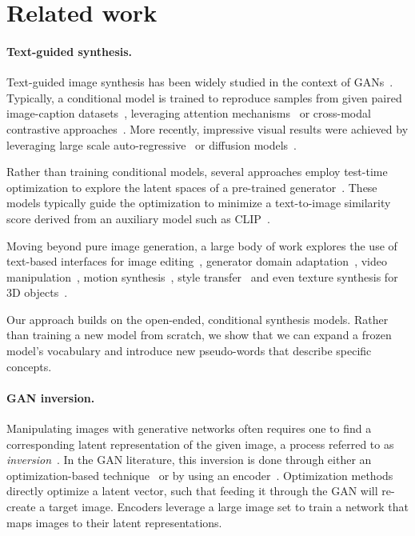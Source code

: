 \section{Related work}

\paragraph{Text-guided synthesis.}

Text-guided image synthesis has been widely studied in the context of GANs~\citep{goodfellow2014generative}. Typically, a conditional model is trained to reproduce samples from given paired image-caption datasets~\citep{zhu2019dm,tao2020df}, leveraging attention mechanisms~\citep{xu2018attngan} or cross-modal contrastive approaches~\citep{zhang2021cross,ye2021improving}. More recently, impressive visual results were achieved by leveraging large scale auto-regressive~\citep{ramesh2021zero,yu2022scaling} or diffusion models~\citep{ramesh2022hierarchical,saharia2022photorealistic,nichol2021glide,rombach2021highresolution}.

Rather than training conditional models, several approaches employ test-time optimization to explore the latent spaces of a pre-trained generator~\citep{crowson2022vqgan,murdock2021bigsleep,crowson2021diffusion}. These models typically guide the optimization to minimize a text-to-image similarity score derived from an auxiliary model such as CLIP~\citep{radford2021learning}.

Moving beyond pure image generation, a large body of work explores the use of text-based interfaces for image editing~\citep{patashnik2021styleclip,abdal2021clip2stylegan,avrahami2022blended}, generator domain adaptation~\citep{gal2021stylegan,kim2022diffusionclip}, video manipulation~\citep{tzaban2022stitch,bar2022text2live}, motion synthesis~\citep{tevet2022motionclip,petrovich22temos}, style transfer~\citep{kwon2021clipstyler,liu2022name} and even texture synthesis for 3D objects~\citep{text2mesh}.

Our approach builds on the open-ended, conditional synthesis models. Rather than training a new model from scratch, we show that we can expand a frozen model's vocabulary and introduce new pseudo-words that describe specific concepts. 

 
\paragraph{GAN inversion.}
Manipulating images with generative networks often requires one to find a corresponding latent representation of the given image, a process referred to as \textit{inversion}~\citep{zhu2016generative,xia2021gan}.
In the GAN literature, this inversion is done through either an optimization-based technique~\citep{abdal2019image2stylegan,abdal2020image2stylegan++,zhu2020improved,gu2020image} or by using an encoder~\citep{richardson2020encoding,zhu2020domain,pidhorskyi2020adversarial,tov2021designing}. Optimization methods directly optimize a latent vector, such that feeding it through the GAN will re-create a target image. Encoders leverage a large image set to train a network that maps images to their latent representations. 

